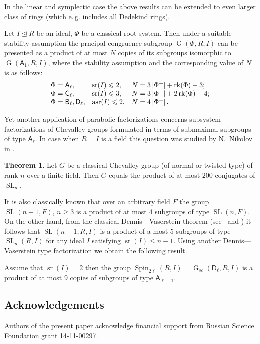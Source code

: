 \documentclass[12pt]{amsart}
\numberwithin{equation}{section}
\theoremstyle{definition}
\newtheorem*{thm*}{Theorem}
\DeclareMathOperator{\G}{G}
\DeclareMathOperator{\SL}{SL}
\DeclareMathOperator{\sr}{sr}
\DeclareMathOperator{\Spin}{Spin}
\DeclareMathOperator{\asr}{asr}
\DeclareMathOperator{\rk}{rk}
\newcommand{\rA}{\mathsf{A}}
\newcommand{\rB}{\mathsf{B}}
\newcommand{\rC}{\mathsf{C}}
\newcommand{\rD}{\mathsf{D}}
\begin{document}
In the linear and symplectic case the above results can be extended to even larger class of rings (which e.\,g. includes all Dedekind rings).
\begin{thm}\label{thm:SL2width}
Let $I\trianglelefteq R$ be an ideal, $\Phi$ be a classical root system. Then under a suitable stability assumption the prncipal congruence subgroup $\G(\Phi,R,I)$ can be presented as a product of at most $N$ copies of its subgroups isomorphic to $\G(\rA_1,R,I)$, where the stability assumption and the corresponding value of $N$ is as follows:
\[\begin{array}{l@{\quad}l@{\quad}l}
\Phi=\rA_\ell, & \sr(I)\leqslant 2, & N=3\left|\Phi^+\right|+\rk(\Phi) - 3; \\
\Phi=\rC_\ell, & \sr(I)\leqslant 3, & N=3\left|\Phi^+\right|+2\rk(\Phi) - 4; \\
\Phi=\rB_\ell,\rD_\ell, & \asr(I)\leqslant 2, & N=4\left|\Phi^+\right|.
\end{array}\]
\end{thm}

Yet another application of parabolic factorizations concerns subsystem factorizations of Chevalley groups formulated in terms of submaximal subgroups of type $\rA_\ell$.
In case when $R=I$ is a field this question was studied by N.~Nikolov in \cite{NikProdDecomp}. 
\begin{thm*} Let $G$ be a classical Chevalley group (of normal or twisted type) of rank $n$ over a finite field.
Then $G$ equals the product of at most $200$ conjugates of $\SL_n$. \end{thm*}

It is also classically known that over an arbitrary field $F$ the group $\SL(n+1, F)$, $n\geq 3$ is a product of at most $4$ subgroups of type $\SL(n, F)$.
On the other hand, from the classical Dennis---Vaserstein theorem (see~\cite{Va69} and \cite[Lemma~2.1]{ST76})
it follows that $\SL(n+1, R, I)$ is a product of a most $5$ subgroups of type $\SL_n(R, I)$ for any ideal $I$ satisfying $\sr(I)\leqslant n-1$.
Using another Dennis---Vaserstein type factorization we obtain the following result.
\begin{thm}\label{thm:spin-sln-prod}
Assume that $\sr(I) = 2$ then the group $\Spin_{2\ell}(R, I)=\G_{sc}(\rD_\ell, R, I)$ is a product of at most $9$ copies of subgroups of type $\rA_{\ell-1}$.
\end{thm}


\subsection{Acknowledgements}
Authors of the present paper acknowledge financial support from Russian Science Foundation grant 14-11-00297.
\end{document}
